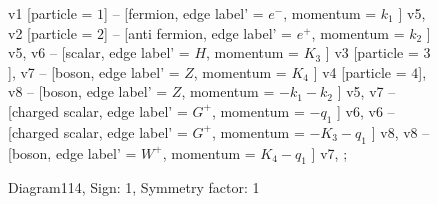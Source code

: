 \documentclass{revtex4}
\begin{document}
\begin{figure}[!htb]
\begin{center}
{    %
v1 [particle = \(1\)] -- [fermion, edge label' = \(e^{-}\), momentum = \(k_{1}\) ] v5, 
v2 [particle = \(2\)] -- [anti fermion, edge label' = \(e^{+}\), momentum = \(k_{2}\) ] v5, 
v6 -- [scalar, edge label' = \(H\), momentum = \(K_{3}\) ] v3 [particle = \(3\)], 
v7 -- [boson, edge label' = \(Z\), momentum = \(K_{4}\) ] v4 [particle = \(4\)], 
v8 -- [boson, edge label' = \(Z\), momentum = \(-k_{1} - k_{2}\) ] v5, 
v7 -- [charged scalar, edge label' = \(G^{+}\), momentum = \(-q_{1}\) ] v6, 
v6 -- [charged scalar, edge label' = \(G^{+}\), momentum = \(-K_{3} - q_{1}\) ] v8, 
v8 -- [boson, edge label' = \(W^{+}\), momentum = \(K_{4} - q_{1}\) ] v7, 
};
\end{center}
\caption{Diagram114, Sign: 1, Symmetry factor: 1}
\end{figure}
\newpage
\end{document}
